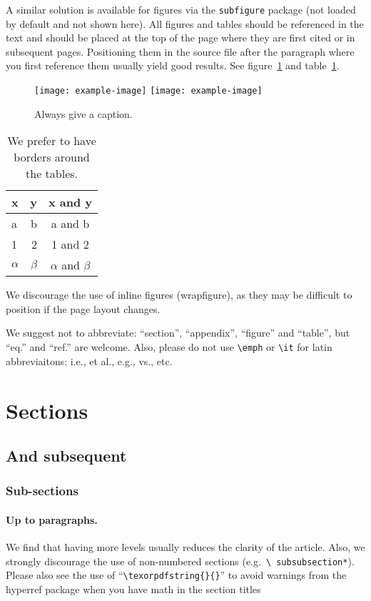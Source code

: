 \documentclass[a4paper,11pt]{article}
\begin{document}
A similar solution is available for figures via the \texttt{subfigure}
package (not loaded by default and not shown here).
All figures and tables should be referenced in the text and should be
placed at the top of the page where they are first cited or in
subsequent pages. Positioning them in the source file
after the paragraph where you first reference them usually yield good
results. See figure~\ref{fig:i} and table~\ref{tab:i}.

\begin{figure}[tbp]
\centering 
\texttt{[image: example-image]}
\hfill
\texttt{[image: example-image]}
\caption{\label{fig:i} Always give a caption.}
\end{figure}

\begin{table}[tbp]
\centering
\begin{tabular}{|lr|c|}
\hline
x&y&x and y\\
\hline
a & b & a and b\\
1 & 2 & 1 and 2\\
$\alpha$ & $\beta$ & $\alpha$ and $\beta$\\
\hline
\end{tabular}
\caption{\label{tab:i} We prefer to have borders around the tables.}
\end{table}

We discourage the use of inline figures (wrapfigure), as they may be
difficult to position if the page layout changes.

We suggest not to abbreviate: ``section'', ``appendix'', ``figure''
and ``table'', but ``eq.'' and ``ref.'' are welcome. Also, please do
not use \texttt{\textbackslash emph} or \texttt{\textbackslash it} for
latin abbreviaitons: i.e., et al., e.g., vs., etc.



\section{Sections}
\subsection{And subsequent}
\subsubsection{Sub-sections}
\paragraph{Up to paragraphs.} We find that having more levels usually
reduces the clarity of the article. Also, we strongly discourage the
use of non-numbered sections (e.g.~\texttt{\textbackslash
  subsubsection*}).  Please also see the use of
``\texttt{\textbackslash texorpdfstring\{\}\{\}}'' to avoid warnings
from the hyperref package when you have math in the section titles
\end{document}
